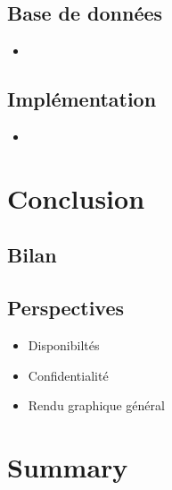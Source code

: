\documentclass{beamer}
\begin{document}
\subsection{Base de données}

\begin{frame}
    \begin{itemize}
        \item{}
    \end{itemize}  
\end{frame}

\subsection{Implémentation}
\begin{frame}
  \begin{itemize}
      \item{}
  \end{itemize}
\end{frame}

\section{Conclusion}

\subsection{Bilan}



\subsection{Perspectives}
\begin{frame}
  \begin{itemize}
      \item{Disponibiltés}
      \item{Confidentialité}
      \item{Rendu graphique général}
  \end{itemize}
\end{frame}

\section*{Summary}
\end{document}
